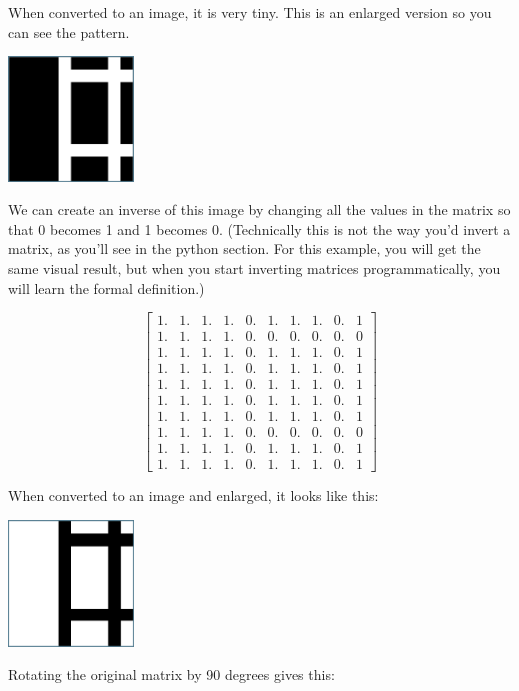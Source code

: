 When converted to an image, it is very tiny. This is an enlarged version so you can see the pattern.

\includegraphics[width=0.25\textwidth]{normal.png}

We can create an inverse of this image by changing all the values in the matrix so that 0 becomes 1 and 1 becomes 0. (Technically this is not the way you'd invert a matrix, as you'll see in the python section. For this example, you will get the same visual result, but when you start inverting matrices programmatically, you will learn the formal definition.)

$$\begin{bmatrix}
1. & 1. & 1. & 1. & 0. & 1. & 1. & 1. & 0. & 1\\
1. & 1. & 1. & 1. & 0. & 0. & 0. & 0. & 0. & 0\\
1. & 1. & 1. & 1. & 0. & 1. & 1. & 1. & 0. & 1\\
1. & 1. & 1. & 1. & 0. & 1. & 1. & 1. & 0. & 1\\
1. & 1. & 1. & 1. & 0. & 1. & 1. & 1. & 0. & 1\\
1. & 1. & 1. & 1. & 0. & 1. & 1. & 1. & 0. & 1\\
1. & 1. & 1. & 1. & 0. & 1. & 1. & 1. & 0. & 1\\
1. & 1. & 1. & 1. & 0. & 0. & 0. & 0. & 0. & 0\\
1. & 1. & 1. & 1. & 0. & 1. & 1. & 1. & 0. & 1\\
1. & 1. & 1. & 1. & 0. & 1. & 1. & 1. & 0. & 1
\end{bmatrix}$$

When converted to an image and enlarged, it looks like this:

\includegraphics[width=0.25\textwidth]{inverse.png}

Rotating the original matrix by 90 degrees gives this:

